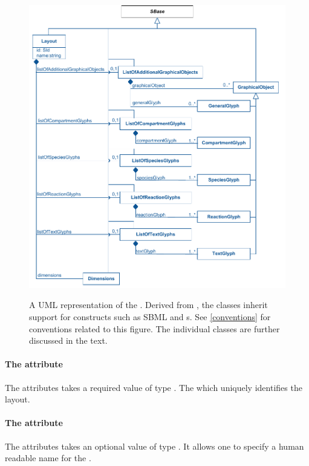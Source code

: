 \begin{figure}[!ht]
\includegraphics{uml/layout-layout-uml}\\
\caption{A UML representation of the \LayoutPackage. Derived from 
\SBase, the \Layout classes inherit support for constructs such as SBML 
\Notes and {\Annotation}s. See \ref{conventions} for conventions related 
to this figure. The individual classes are further discussed in the 
text.} 
\label{figure:layout_uml}
\end{figure}

\paragraph{The  attribute}
The  attributes takes a required value of type . 
The  which uniquely identifies the layout. 


\paragraph{The  attribute}
The  attributes takes an optional value of type 
. It allows one to specify a human readable name for the 
\LayoutClass. 



